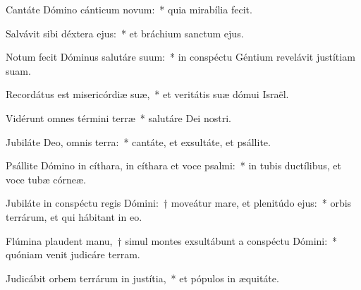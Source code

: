 \item Cantáte Dómino cánticum novum:~* quia mirabília fecit.

\item Salvávit sibi déxtera ejus:~* et bráchium sanctum ejus.

\item Notum fecit Dóminus salutáre suum:~* in conspéctu Géntium revelávit justítiam suam.

\item Recordátus est misericórdiæ suæ,~* et veritátis suæ dómui Israël.

\item Vidérunt omnes términi terræ~* salutáre Dei nostri.

\item Jubiláte Deo, omnis terra:~* cantáte, et exsultáte, et psállite.

\item Psállite Dómino in cíthara, in cíthara et voce psalmi:~* in tubis ductílibus, et voce tubæ córneæ.

\item Jubiláte in conspéctu regis Dómini:~† moveátur mare, et plenitúdo ejus:~* orbis terrárum, et qui hábitant in eo.

\item Flúmina plaudent manu,~† simul montes exsultábunt a conspéctu Dómini:~* quóniam venit judicáre terram.

\item Judicábit orbem terrárum in justítia,~* et pópulos in æquitáte.
